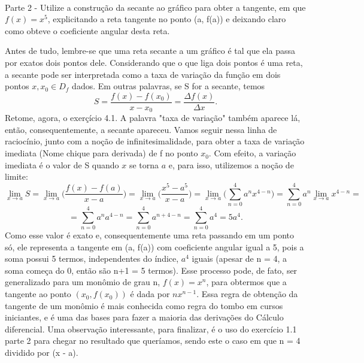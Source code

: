 \documentclass[Calculus1/exercícios_de_cálculo.tex]{subfiles}
\begin{document}
\paragraph{} Parte 2 - Utilize a construção da secante ao gráfico para obter a tangente, em que $f(x) = x^5$, explicitando a reta tangente no ponto (a, f(a)) e deixando claro como obteve o coeficiente angular desta reta.
\begin{sol*}
	Antes de tudo, lembre-se que uma reta secante a um gráfico é tal que ela passa por exatos dois pontos dele. Considerando que o que liga dois pontos é uma reta, a secante pode ser interpretada como a taxa de variação da função em dois pontos $x, x_0\in{D_f}$ dados. Em outras palavras, se S for a secante, temos
	$$
		S = \frac{f(x) - f(x_0)}{x - x_0} = \frac{\Delta{f(x)}}{\Delta{x}}.
	$$
	Retome, agora, o exerçício 4.1. A palavra "taxa de variação" também aparece lá, então, consequentemente, a secante apareceu. Vamos seguir nessa linha de racioc\'inio, junto com a noç\~ao de infinitesimalidade, para obter a taxa de variaç\~ao imediata (Nome chique para derivada) de f no ponto $x_0$. Com efeito, a variaç\~ao imediata é o valor de S quando $x$ se torna $a$ e, para isso, utilizemos a noç\~ao de limite:
	$$
		\lim_{x\to{a}} S = \lim_{x\to{a}}\biggl(\frac{f(x) - f(a)}{x - a}\biggr) = \lim_{x\to{a}}\biggl(\frac{x^5 - a^5}{x - a}\biggr) = \lim_{x\to{a}}\biggl(\sum_{n=0}^{4}a^nx^{4-n}\biggr) = \sum_{n=0}^{4}a^n\lim_{x\to{a}}x^{4-n}=
	$$
	$$
		= \sum_{n=0}^{4}a^na^{4-n} = \sum_{n=0}^{4}a^{n+4-n} = \sum_{n=0}^{4}a^4 = 5a^4 .
	$$
	Como esse valor é exato e, consequentemente uma reta passando em um ponto só, ele representa a tangente em (a, f(a)) com coeficiente angular igual a 5, pois a soma possui 5 termos, independentes do índice, $a^4$ iguais (apesar de n = 4, a soma começa do 0, então são n+1 = 5 termos). Esse processo pode, de fato, ser generalizado para um monômio de grau n, $f(x) = x^n$, para obtermos que a tangente ao ponto $(x_0, f(x_0))$ é dada por $nx^{n-1}.$ Essa regra de obtenç\~ao da tangente de um monômio é mais conhecida como regra do tombo em cursos iniciantes, e é uma das bases para fazer a maioria das derivações do Cálculo diferencial. Uma observaç\~ao interessante, para finalizar, é o uso do exerc\'icio 1.1 parte 2 para chegar no resultado que quer\'iamos, sendo este o caso em que n = 4 dividido por (x - a).
	\qedsymbol
\end{sol*}
\end{document}
